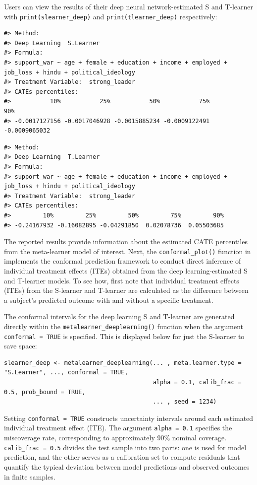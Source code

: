 Users can view the results of their deep neural network-estimated S and
T-learner with \texttt{print(slearner\_deep)} and \texttt{print(tlearner\_deep)}
respectively:

\begin{verbatim}
#> Method:
#> Deep Learning  S.Learner
#> Formula:
#> support_war ~ age + female + education + income + employed +      job_loss + hindu + political_ideology
#> Treatment Variable:  strong_leader
#> CATEs percentiles:
#>           10%           25%           50%           75%           90% 
#> -0.0017127156 -0.0017046928 -0.0015885234 -0.0009122491 -0.0009065032
\end{verbatim}

\begin{verbatim}
#> Method:
#> Deep Learning  T.Learner
#> Formula:
#> support_war ~ age + female + education + income + employed +      job_loss + hindu + political_ideology
#> Treatment Variable:  strong_leader
#> CATEs percentiles:
#>         10%         25%         50%         75%         90% 
#> -0.24167932 -0.16082895 -0.04291850  0.02078736  0.05503685
\end{verbatim}

The reported results provide information about the estimated CATE
percentiles from the meta-learner model of interest. Next, the
\texttt{conformal\_plot()} function in  implements the
conformal prediction framework to conduct direct inference of individual
treatment effects (ITEs) obtained from the deep learning-estimated S and
T-learner models. To see how, first note that individual treatment
effects (ITEs) from the S-learner and T-learner are calculated as the
difference between a subject's predicted outcome with and without a
specific treatment.

The conformal intervals for the deep learning S and T-learner are
generated directly within the \texttt{metalearner\_deeplearning()} function when
the argument \texttt{conformal\ =\ TRUE} is specified. This is displayed below
for just the S-learner to save space:

\begin{verbatim}
slearner_deep <- metalearner_deeplearning(... , meta.learner.type = "S.Learner", ..., conformal = TRUE,  
                                          alpha = 0.1, calib_frac = 0.5, prob_bound = TRUE,
                                          ... , seed = 1234)
\end{verbatim}

Setting \texttt{conformal\ =\ TRUE} constructs uncertainty intervals around each
estimated individual treatment effect (ITE). The argument \texttt{alpha\ =\ 0.1}
specifies the miscoverage rate, corresponding to approximately 90\%
nominal coverage. \texttt{calib\_frac\ =\ 0.5} divides the test sample into two
parts: one is used for model prediction, and the other serves as a
calibration set to compute residuals that quantify the typical deviation
between model predictions and observed outcomes in finite samples.

